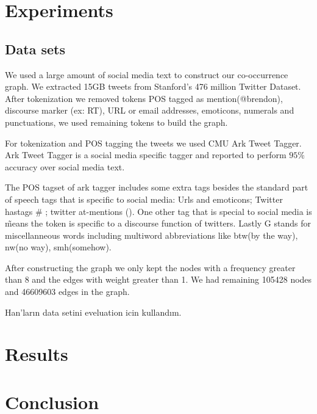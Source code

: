 \section{Experiments}
\label{sec:experiments}

\subsection{Data sets}

We used a large amount of social media text to construct our co-occurrence graph. We extracted 15GB tweets from Stanford's 476 million Twitter Dataset\cite{DBLP:conf/wsdm/YangL11}. After tokenization we removed tokens POS tagged as mention(@brendon), discourse marker (ex: RT), URL or email addresses, emoticons, numerals and punctuations, we used remaining tokens to build the graph.

For tokenization and POS tagging the tweets we used CMU Ark Tweet Tagger\cite{DBLP:conf/naacl/OwoputiODGSS13}\cite{Gimpel:2011:PTT:2002736.2002747}. Ark Tweet Tagger is a social media specific tagger and reported to perform $95\%$ accuracy over social media text.

The POS tagset of ark tagger includes some extra tags besides the standard part of speech tags that is specific to social media: Urls and emoticons; Twitter hastags \# ; twitter at-mentions (\@). One other tag that is special to social media is \~ means the token is specific to a discourse function of twitters. Lastly G stands for miscellanneous words including multiword abbreviations like btw(by the way), nw(no way), smh(somehow).


After constructing the graph we only kept the nodes with a frequency greater than 8 and the edges with weight greater than 1. We had remaining 105428 nodes and 46609603 edges in the graph.

Han'ların data setini eveluation icin kullandım.

\section{Results}


\section{Conclusion}
